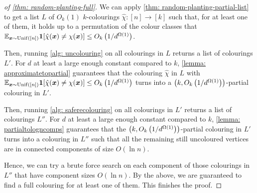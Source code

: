 \begin{proof}[of \cref{thm: random-planting-full}]
    We can apply \cref{thm: random-planting-partial-list} to get a list $L$ of $O_{k}(1)$ $k$-colourings $\hat{\chi}: [n] \to [k]$ such that, for at least one of them, it holds up to a permutation of the colour classes that $\mathbb{E}_{\bm{x} \sim \operatorname{Unif}([n])} \mathbf{1}[\hat\chi(\bm{x}) \neq \chi(\bm{x})] \leq O_k\left(1/d^{\Omega(1)}\right)$.


    Then, running \cref{alg: uncolouring} on all colourings in $L$ returns a list of colourings $L'$. For $d$ at least a large enough constant compared to $k$, \cref{lemma: approximatetopartial} guarantees that the colouring $\hat{\chi}$ in $L$ with $\mathbb{E}_{\bm{x} \sim \operatorname{Unif}([n])} \mathbf{1}[\hat\chi(\bm{x}) \neq \chi(\bm{x})] \leq O_k\left(1/d^{\Omega(1)}\right)$ turns into a $\left(k, O_k\left(1/d^{\Omega(1)}\right)\right)$-partial colouring in $L'$.

    Then, running \cref{alg: saferecolouring} on all colourings in $L'$ returns a list of colourings $L''$. For $d$ at least a large enough constant compared to $k$, \cref{lemma: partialtologncomps} guarantees that the $\left(k, O_k\left(1/d^{\Omega(1)}\right)\right)$-partial colouring in $L'$ turns into a colouring in $L''$ such that all the remaining still uncoloured vertices are in connected components of size $O(\ln{n})$.

    Hence, we can try a brute force search on each component of those colourings in $L''$ that have component sizes $O(\ln{n})$. By the above, we are guaranteed to find a full colouring for at least one of them. This finishes the proof.
\end{proof}
